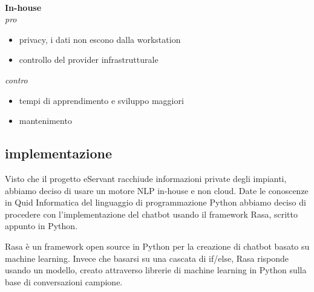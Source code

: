 \paragraph{}

\textbf{In-house}\\
\textit{pro}\\
\begin{itemize}
    \item privacy, i dati non escono dalla workstation
    \item controllo del provider infrastrutturale
\end{itemize}
\textit{contro}
\begin{itemize}
    \item tempi di apprendimento e sviluppo maggiori
    \item mantenimento
\end{itemize}

\subsection{implementazione}

\begin{figure}[htp]
    \centering  
\end{figure}

Visto che il progetto eServant racchiude informazioni private degli impianti, abbiamo deciso di usare un motore
NLP in-house e non cloud.
Date le conoscenze in Quid Informatica del linguaggio di programmazione Python abbiamo deciso di procedere
con l'implementazione del chatbot usando il framework Rasa, scritto appunto in Python.

Rasa è un framework open source in Python per la creazione di chatbot basato su machine learning.
Invece che basarsi su una cascata di if/else, Rasa risponde usando un modello, creato attraverso
librerie di machine learning in Python sulla base di conversazioni campione.
